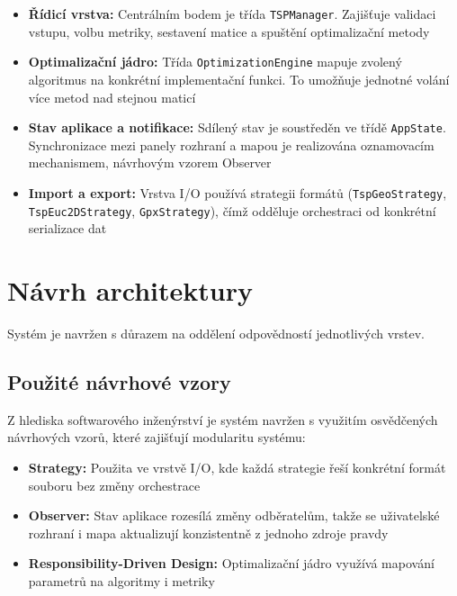 \begin{itemize}
    \item \textbf{Řídicí vrstva:} Centrálním bodem je třída \texttt{TSPManager}. Zajišťuje validaci vstupu, volbu metriky, sestavení matice a spuštění optimalizační metody
    \item \textbf{Optimalizační jádro:} Třída \texttt{OptimizationEngine} mapuje zvolený algoritmus na konkrétní implementační funkci. To umožňuje jednotné volání více metod nad stejnou maticí
    \item \textbf{Stav aplikace a notifikace:} Sdílený stav je soustředěn ve třídě \texttt{AppState}. Synchronizace mezi panely rozhraní a mapou je realizována oznamovacím mechanismem, návrhovým vzorem Observer
    \item \textbf{Import a export:} Vrstva I/O používá strategii formátů (\texttt{TspGeoStrategy}, \texttt{TspEuc2DStrategy}, \texttt{GpxStrategy}), čímž odděluje orchestraci od konkrétní serializace dat
\end{itemize}



\section{Návrh architektury}
Systém je navržen s důrazem na oddělení odpovědností jednotlivých vrstev.

\subsection{Použité návrhové vzory}
Z hlediska softwarového inženýrství je systém navržen s využitím osvědčených návrhových vzorů, které zajišťují modularitu systému:

\begin{itemize}
    \item \textbf{Strategy:} Použita ve vrstvě I/O, kde každá strategie řeší konkrétní formát souboru bez změny orchestrace
    \item \textbf{Observer:} Stav aplikace rozesílá změny odběratelům, takže se uživatelské rozhraní i mapa aktualizují konzistentně z jednoho zdroje pravdy
    \item \textbf{Responsibility-Driven Design:} Optimalizační jádro využívá mapování parametrů na algoritmy i metriky
\end{itemize}

